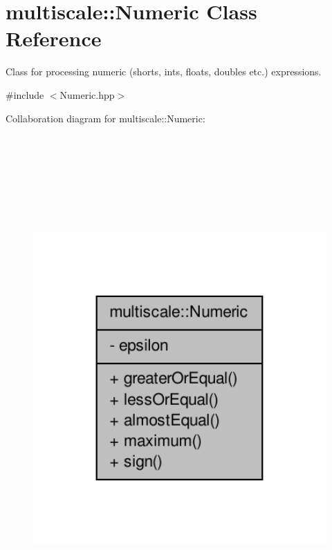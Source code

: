 \hypertarget{classmultiscale_1_1Numeric}{\section{multiscale\-:\-:Numeric Class Reference}
\label{classmultiscale_1_1Numeric}
}


Class for processing numeric (shorts, ints, floats, doubles etc.) expressions.  




{\ttfamily \#include $<$Numeric.\-hpp$>$}



Collaboration diagram for multiscale\-:\-:Numeric\-:\nopagebreak
\begin{figure}[H]
\begin{center}
\leavevmode
\includegraphics[height=550pt]{classmultiscale_1_1Numeric__coll__graph}
\end{center}
\end{figure}
